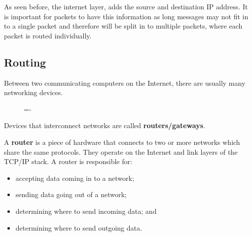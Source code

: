 \documentclass[a4paper]{systems-software}
\begin{document}
As seen before, the internet layer, adds the source and destination IP address. It is important for packets to have this information as long messages may not fit in to a single packet and therefore will be  split in to multiple packets, where each packet is routed individually.


\newpage

\subsection*{Routing}

Between two communicating computers on the Internet, there are usually many networking devices.

\begin{figure}[H]
	\lineskip=-\fboxrule
\end{figure}

Devices that interconnect networks are called \textbf{routers/gateways}.

A \textbf{router} is a piece of hardware that connects to two or more networks which share the same protocols. They operate on the Internet and link layers of the TCP/IP stack. A router is responsible for:
\begin{itemize}
	\item accepting data coming in to a network;
	\item sending data going out of a network;
	\item determining where to send incoming data; and
	\item determining where to send outgoing data.
\end{itemize}
\end{document}
